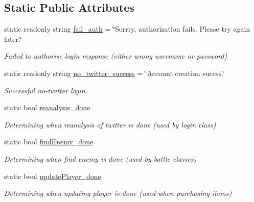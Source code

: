 \subsection*{Static Public Attributes}
\begin{DoxyCompactItemize}
\item 
\mbox{\label{class_server_ab625c993d6d1ab40721d3ca33af00cb8}} 
static readonly string \mbox{\hyperlink{class_server_ab625c993d6d1ab40721d3ca33af00cb8}{fail\+\_\+auth}} = \char`\"{}Sorrry, authorization fails. Please try again later.\char`\"{}
\begin{DoxyCompactList}\small\item\em Failed to authorise login response (either wrong username or password) \end{DoxyCompactList}\item 
\mbox{\label{class_server_a68768a2b0fbd0595e8690908bf8bb66b}} 
static readonly string \mbox{\hyperlink{class_server_a68768a2b0fbd0595e8690908bf8bb66b}{no\+\_\+twitter\+\_\+success}} = \char`\"{}Account creation succss.\char`\"{}
\begin{DoxyCompactList}\small\item\em Successful no-\/twitter login. \end{DoxyCompactList}\item 
\mbox{\label{class_server_a42280d186d88088d0f060ccb02974ae9}} 
static bool \mbox{\hyperlink{class_server_a42280d186d88088d0f060ccb02974ae9}{reanalysis\+\_\+done}}
\begin{DoxyCompactList}\small\item\em Determining when reanalysis of twitter is done (used by login class) \end{DoxyCompactList}\item 
\mbox{\label{class_server_a914251970cab3255c343d60a6a7a55f5}} 
static bool \mbox{\hyperlink{class_server_a914251970cab3255c343d60a6a7a55f5}{find\+Enemy\+\_\+done}}
\begin{DoxyCompactList}\small\item\em Determining when find enemy is done (used by battle classes) \end{DoxyCompactList}\item 
\mbox{\label{class_server_acf78dae58011f4406003d79e6df7e3ef}} 
static bool \mbox{\hyperlink{class_server_acf78dae58011f4406003d79e6df7e3ef}{update\+Player\+\_\+done}}
\begin{DoxyCompactList}\small\item\em Determining when updating player is done (used when purchasing items) \end{DoxyCompactList}\end{DoxyCompactItemize}
